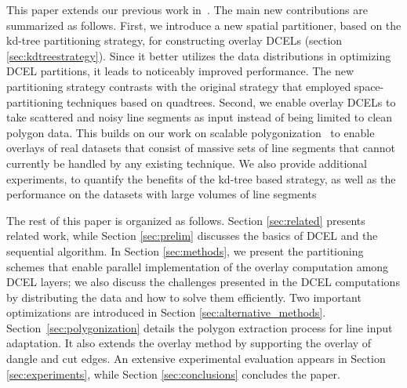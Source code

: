 
This paper extends our previous work in~\cite{sdcel_paper}.
The main new contributions are summarized as follows.
First, we introduce a new spatial partitioner, based on the kd-tree partitioning strategy, for constructing overlay DCELs (section \ref{sec:kdtreestrategy}). Since it better utilizes the data distributions in optimizing DCEL partitions, it leads to noticeably improved performance.
The new partitioning strategy contrasts with the original strategy that employed space-partitioning techniques based on quadtrees. 
Second, we enable overlay DCELs to take scattered and noisy line segments as input instead of being limited to clean polygon data.
This builds on our work on scalable polygonization~\cite{LailaMDMPaper} to enable overlays of real datasets that consist of massive sets of line segments that cannot currently be handled by any existing technique. We also provide additional experiments, to quantify the benefits of the kd-tree based strategy, as well as the performance on the datasets with large volumes of line segments

The rest of this paper is organized as follows. Section \ref{sec:related} presents related work, while Section \ref{sec:prelim} discusses the basics of DCEL and the sequential algorithm. In Section \ref{sec:methods}, we present the partitioning schemes that enable parallel implementation of the overlay computation among DCEL layers; we also discuss the challenges presented in the DCEL computations by distributing the data and how to solve them efficiently. Two important optimizations are introduced in Section \ref{sec:alternative_methods}. Section~\ref{sec:polygonization} details the polygon extraction process for line input adaptation. It also extends the overlay method by supporting the overlay of dangle and cut edges. 
An extensive experimental evaluation appears in Section \ref{sec:experiments}, while Section \ref{sec:conclusions} concludes the paper.